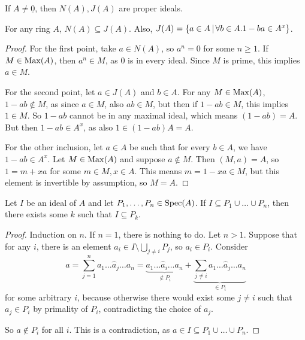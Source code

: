 \begin{remark}
  If $A \ne \underline{0}$, then $N(A), J(A)$ are proper ideals.
\end{remark}

\begin{lemma}
  \label{lemma:koma-01-jacobson}
  For any ring $A$, $N(A) \subseteq J(A)$.
  Also, $J(A) = \{ a \in A \,|\, \forall b \in A . 1 - ba \in A^x \}$.
\end{lemma}

\begin{proof}
  For the first point, take $a \in N(A)$, so $a^n = 0$ for some $n \ge 1$.
  If $M \in \operatorname{Max}(A)$, then $a^n \in M$, as $0$ is in every ideal.
  Since $M$ is prime, this implies $a \in M$.

  For the second point, let $a \in J(A)$ and $b \in A$.
  For any $M \in \operatorname{Max}(A)$, $1 - ab \notin M$, as since $a \in M$, also $ab \in
  M$, but then if $1 - ab \in M$, this implies $1 \in M$.
  So $1 - ab$ cannot be in any maximal ideal, which means $(1-ab) = A$.
  But then $1 - ab \in A^x$, as also $1 \in (1-ab) A = A$.

  For the other inclusion, let $a \in A$ be such that for every $b \in A$, we
  have $1 - ab \in A^x$.
  Let $M \in \operatorname{Max}(A)$ and suppose $a \notin M$.
  Then $(M, a) = A$, so $1 = m + xa$ for some $m \in M, x \in A$.
  This means $m = 1 - xa \in M$, but this element is invertible by assumption,
  so $M = A$.
  \protislovje{}
\end{proof}

\begin{lemma}
  Let $I$ be an ideal of $A$ and let $P_1, \ldots, P_n \in \operatorname{Spec}(A)$.
  If $I \subseteq P_1 \cup \ldots \cup P_n$, then there exists some $k$ such
  that $I \subseteq P_k$.
\end{lemma}

\begin{proof}
  Induction on $n$.
  If $n = 1$, there is nothing to do.
  Let $n > 1$.
  Suppose that for any $i$, there is an element $a_i \in I \setminus \bigcup_{j
	\ne i} P_j$, so $a_i \in P_i$.
  Consider
  \[
	a = \sum_{j=1}^n a_1 \ldots \hat{a}_j \ldots a_n
	= \underbrace{a_1 \ldots \hat{a}_i \ldots a_n}_{\notin P_i} +
	\underbrace{\sum_{j \ne i} a_1 \ldots \hat{a}_j \ldots a_n}_{\in P_i}
  \]
  for some arbitrary $i$, because otherwise there would exist some $j \ne i$
  such that $a_j \in P_i$ by primality of $P_i$, contradicting the choice of
  $a_j$.

  So $a \notin P_i$ for all $i$.
  This is a contradiction, as $a \in I \subseteq P_1 \cup \ldots \cup P_n$.
\end{proof}

